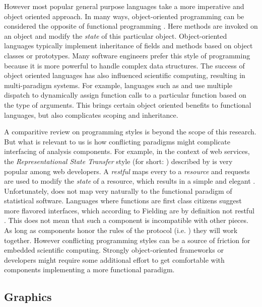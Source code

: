 However most popular general purpose languages take a more imperative and object oriented approach. In many ways, object-oriented programming can be considered the opposite of functional programming \citep{pythonfunctional}. Here methods are invoked on an object and modify the \emph{state} of this particular object. Object-oriented languages typically implement inheritance of fields and methods based on object classes or prototypes. Many software engineers prefer this style of programming because it is more powerful to handle complex data structures. The success of object oriented languages has also influenced scientific computing, resulting in multi-paradigm systems. For example, languages such as \Julia and \R use multiple dispatch to dynamically assign function calls to a particular function based on the type of arguments. This brings certain object oriented benefits to functional languages, but also complicates scoping and inheritance. 

A comparitive review on programming styles is beyond the scope of this research. But what is relevant to us is how conflicting paradigms might complicate interfacing of analysis components. For example, in the context of web services, the \emph{Representational State Transfer} style (for short: \REST) described by \cite{fielding2000architectural} is very popular among web developers. A \emph{restful} \API maps every \URL to a \emph{resource} and \HTTP requests are used to modify the \emph{state} of a resource, which results in a simple and elegant \API. Unfortunately, \REST does not map very naturally to the functional paradigm of statistical software. Languages where functions are first class citizens suggest more \RPC flavored interfaces, which according to Fielding are by definition not restful \citep{fielding2008rest}. This does not mean that such a component is incompatible with other pieces. As long as components honor the rules of the protocol (i.e. \HTTP) they will work together. However conflicting programming styles can be a source of friction for embedded scientific computing. Strongly object-oriented frameworks or developers might require some additional effort to get comfortable with components implementing a more functional paradigm.



\subsection{Graphics}

